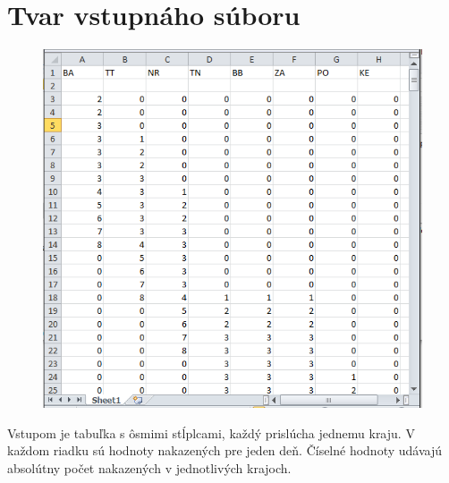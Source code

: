\documentclass[12pt,a4paper]{report}
\begin{document}
\section{Tvar vstupnáho súboru}
\begin{figure}[htb]
	\includegraphics[scale=0.8]{vstup}
	\label{fig:vstup}
\end{figure}

\par Vstupom je tabuľka s ôsmimi stĺplcami, každý prislúcha jednemu kraju. V každom riadku sú hodnoty nakazených pre jeden deň. Číselné hodnoty udávajú absolútny počet nakazených v jednotlivých krajoch.
\end{document}

